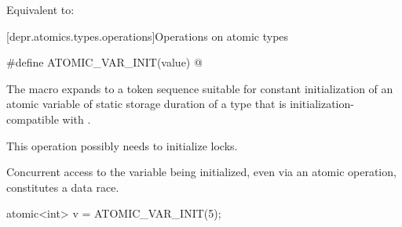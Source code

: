 \begin{itemdescr}
\pnum
\effects
Equivalent to: 
\end{itemdescr}

[depr.atomics.types.operations]{Operations on atomic types}

%
\begin{itemdecl}
#define ATOMIC_VAR_INIT(value) @\seebelow@
\end{itemdecl}

\begin{itemdescr}
\pnum
The macro expands to a token sequence suitable for constant initialization of
an atomic variable of static storage duration of a type that
is initialization-compatible with .
\begin{note}
This operation possibly needs to initialize locks.
\end{note}
Concurrent access to the variable being initialized,
even via an atomic operation,
constitutes a data race.
\begin{example}
\begin{codeblock}
atomic<int> v = ATOMIC_VAR_INIT(5);
\end{codeblock}
\end{example}
\end{itemdescr}
